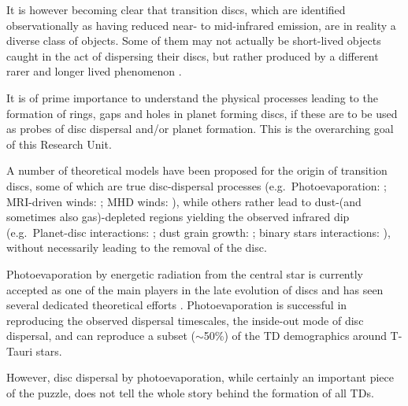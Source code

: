 \documentclass[10pt,fleqn,twoside]{article}
\begin{document}
It is however becoming clear that transition discs, which are
identified observationally as having reduced near- to mid-infrared
emission,  are in reality a diverse class of objects. Some of them may
not actually be short-lived objects caught in the act of dispersing
their discs, but rather produced by a different rarer and longer lived
phenomenon 
\citep[see e.g.,][]{2016PASA...33....5O, 2016ApJ...825...77D}.
\begin{highlight}
It is of prime
importance to understand the physical processes leading to the
formation of rings, gaps and holes in planet forming discs, if these are to
be used as probes of disc dispersal and/or planet formation. This is
the overarching goal of this Research Unit. 
\end{highlight}

A number of theoretical models have been proposed for the origin of
transition discs, some of which are true disc-dispersal processes
(e.g.\ Photoevaporation: \citep{2001MNRAS.328..485C}; MRI-driven
winds: \citep{2009ApJ...691L..49S}; MHD winds: \citep{2016ApJ...821...80B}), 
while others
rather lead to dust-(and sometimes also gas)-depleted regions yielding
the observed infrared dip (e.g.\ Planet-disc interactions: 
\citep{2005ApJ...630L.185C}; dust grain growth: \citep{2005A&A...434..971D}; 
binary stars interactions: \citep{1992ApJ...395L.115M}), without necessarily leading to
the removal of the disc.  

Photoevaporation by energetic radiation from the central star is currently accepted as one of
the main players in the late evolution of discs and has seen several
dedicated theoretical efforts 
\citep[e.g.,][]{2001MNRAS.328..485C, 2006MNRAS.369..216A, 2008ApJ...688..398E,
2009ApJ...699.1639E, 2010MNRAS.401.1415O, 2011MNRAS.412...13O, 2012MNRAS.422.1880O,
2009ApJ...690.1539G, 2009ApJ...705.1237G, 2015ApJ...804...29G}.
Photoevaporation is
successful in reproducing the observed dispersal timescales, the
inside-out mode of disc dispersal, and can reproduce a subset
($\sim$50\%) of the TD demographics around T-Tauri stars.

However, disc dispersal by photoevaporation, while certainly an important piece of the
puzzle, does not tell the whole story behind the formation of all
TDs. 
\end{document}
